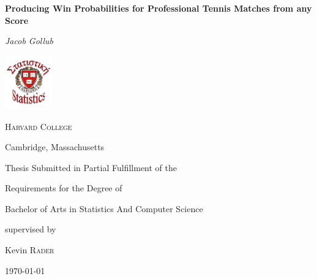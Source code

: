 \documentclass[chapterprefix=false]{report}
\begin{document}
\linespread{2}

\begin{titlepage}
	\centering
	{\huge\bfseries\linespread{1.5}\selectfont Producing Win Probabilities for Professional Tennis Matches from any Score \par}
	\vspace{1cm}
	{\Large\itshape Jacob Gollub}
	\vspace{1cm}\par
	\includegraphics[width=0.15\textwidth]{StatisticsLogo}\par
	{\scshape\LARGE Harvard College \par}
	Cambridge, Massachusetts \par \vspace{1cm}
	\vspace{1cm}
	
	Thesis Submitted in Partial Fulfillment of the
	\par Requirements for the Degree of 
	\par Bachelor of Arts in Statistics And Computer Science
	
	
	\vfill
	supervised by\par
	Kevin \textsc{Rader}

	\vfill

	{\large \today\par}
\end{titlepage} 
\end{document}
